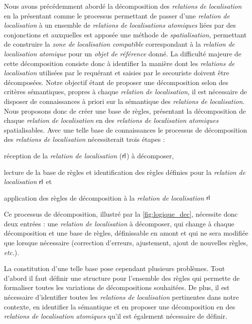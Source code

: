 Nous avons précédemment abordé la décomposition des \emph{relations de
  localisation} en la présentant comme le processus permettant de
passer d'une \emph{relation de localisation} à un ensemble de
\emph{relations de localisations atomiques} liées par des conjonctions
et auxquelles est apposée une méthode de \emph{spatialisation,}
permettant de construire la \emph{zone de localisation compatible}
correspondant à la \emph{relation de localisation atomique} pour un
\emph{objet de référence} donné. La difficulté majeure de cette
décomposition consiste donc à identifier la manière dont les
\emph{relations de localisation} utilisées par le requérant et saisies
par le secouriste doivent être décomposées. Notre objectif étant de
proposer une décomposition selon des critères sémantiques, propres à
chaque \emph{relation de localisation,} il est nécessaire de disposer
de connaissances à priori sur la sémantique des \emph{relations de
  localisation.} Nous proposons donc de créer une base de règles,
présentant la décomposition de chaque \emph{relation de localisation}
en des \emph{relations de localisation atomiques} spatialisables. Avec
une telle base de connaissances le processus de décomposition des
\emph{relations de localisation} nécessiterait trois étapes :
%
\begin{enumerate*}[label=(\arabic*)] 
\item réception de la \emph{relation de localisation}
  ($\text{\textsf{rl}}$) à décomposer,
\item lecture de la base de règles et identification des règles
  définies pour la \emph{relation de localisation}
  $\text{\textsf{rl}}$ et
\item application des règles de décomposition à la \emph{relation de
  localisation} $\text{\textsf{rl}}$
\end{enumerate*}
%
Ce processus de décomposition, illustré par la
\autoref{fig:logique_dec}, nécessite donc deux entrées : une
\emph{relation de localisation} à décomposer, qui change à chaque
décomposition et une base de règles, définissable en amont et qui ne
sera modifiée que lorsque nécessaire (\eg correction d'erreurs,
ajustement, ajout de nouvelles règles, \emph{etc.}).

La constitution d'une telle base pose cependant
plusieurs problèmes. Tout d'abord il faut définir une structure pour
l'ensemble des règles qui permette de formaliser toutes les variations
de décompositions souhaitées. De plus, il est nécessaire d'identifier
toutes les \emph{relations de localisation} pertinentes dans notre
contexte, en identifier la sémantique et en proposer une décomposition
en des \emph{relations de localisation atomiques} qu'il est également
nécessaire de définir.


